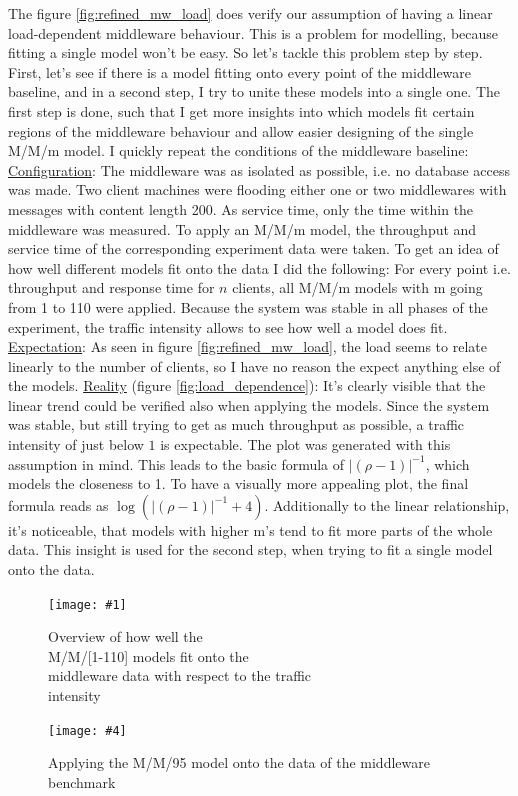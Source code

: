 \documentclass[11pt]{article}
\newcommand\TwoFig[6]{%
	\sbox\IBoxA{\texttt{[image: \#1]}}
	\sbox\IBoxB{\texttt{[image: \#4]}}%
	\ifdim\ht\IBoxA>\ht\IBoxB
	\setlength\IHeight{\ht\IBoxB}\else\setlength\IHeight{\ht\IBoxA}\fi%
	\begin{figure}[!htb]
		\minipage[t]{0.5\textwidth}\centering
		\texttt{[image: \#1]}
		\caption{#2}\label{#3}
		\endminipage \hfill
		\minipage[t]{0.5\textwidth}\centering
		\texttt{[image: \#4]}
		\caption{#5}\label{#6}
		\endminipage
	\end{figure}%
}
\begin{document}
The figure \ref{fig:refined_mw_load} does verify our assumption of having a linear load-dependent middleware behaviour. This is a problem for modelling, because fitting a single model won't be easy. So let's tackle this problem step by step. First, let's see if there is a model fitting onto every point of the middleware baseline, and in a second step, I try to unite these models into a single one. The first step is done, such that I get more insights into which models fit certain regions of the middleware behaviour and allow easier designing of the single M/M/m model. I quickly repeat the conditions of the middleware baseline:
\newline\underline{Configuration}: The middleware was as isolated as possible, i.e. no database access was made. Two client machines were flooding either one or two middlewares with messages with content length 200. As service time, only the time within the middleware was measured. To apply an M/M/m model, the throughput and service time of the corresponding experiment data were taken. To get an idea of how well different models fit onto the data I did the following: For every point i.e. throughput and response time for $n$ clients, all M/M/m models with m going from 1 to 110 were applied. Because the system was stable in all phases of the experiment, the traffic intensity allows to see how well a model does fit.
\newline\underline{Expectation}: As seen in figure \ref{fig:refined_mw_load}, the load seems to relate linearly to the number of clients, so I have no reason the expect anything else of the models.
\newline\underline{Reality} (figure \ref{fig:load_dependence}): It's clearly visible that the linear trend could be verified also when applying the models. Since the system was stable, but still trying to get as much throughput as possible, a traffic intensity of just below $1$ is expectable. The plot was generated with this assumption in mind. This leads to the basic formula of $|(\rho-1)|^{-1}$, which models the closeness to 1. To have a visually more appealing plot, the final formula reads as $\log(|(\rho-1)|^{-1}+4)$. Additionally to the linear relationship, it's noticeable, that models with higher m's tend to fit more parts of the whole data. This insight is used for the second step, when trying to fit a single model onto the data.

\TwoFig {figures/middleware/load_dependence} {Overview of how well the \\M/M/[1-110] models fit onto the\\ middleware data with respect to the traffic\\ intensity} {fig:load_dependence}
		{figures/middleware/mm95} {Applying the M/M/95 model onto the data of the middleware benchmark} {fig:mm95}
\end{document}
